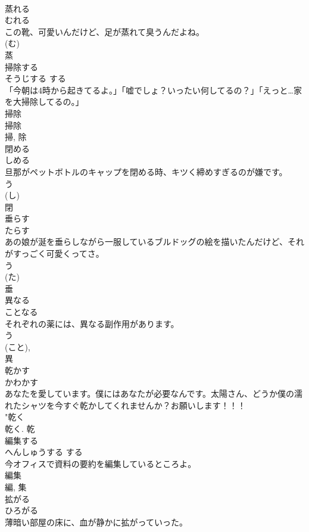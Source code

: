 \documentclass[8pt]{extreport}
\begin{document}
\begin{CJK}{UTF8}{min}
\\	蒸れる	
\\	むれる	
\\	この靴、可愛いんだけど、足が蒸れて臭うんだよね。	
\\	(む) 
\\	蒸	
\\	掃除する	
\\	そうじする	する 
\\	「今朝は4時から起きてるよ。」「嘘でしょ？いったい何してるの？」「えっと…家を大掃除してるの。」	
\\	掃除 
\\	掃除 
\\	掃, 除	
\\	閉める	
\\	しめる	
\\	旦那がペットボトルのキャップを閉める時、キツく締めすぎるのが嫌です。	
\\	う 
\\	(し) 
\\	閉	
\\	垂らす	
\\	たらす	
\\	あの娘が涎を垂らしながら一服しているブルドッグの絵を描いたんだけど、それがすっごく可愛くってさ。	
\\	う 
\\	(た) 
\\	垂	
\\	異なる	
\\	ことなる	
\\	それぞれの薬には、異なる副作用があります。	
\\	う 
\\	(こと), 
\\	異	
\\	乾かす	
\\	かわかす	
\\	あなたを愛しています。僕にはあなたが必要なんです。太陽さん、どうか僕の濡れたシャツを今すぐ乾かしてくれませんか？お願いします！！！	
\\	"乾く 
\\	乾く.	乾	
\\	編集する	
\\	へんしゅうする	する 
\\	今オフィスで資料の要約を編集しているところよ。	
\\	編集 
\\	編, 集	
\\	拡がる	
\\	ひろがる	
\\	薄暗い部屋の床に、血が静かに拡がっていった。	

\end{CJK}
\end{document}
